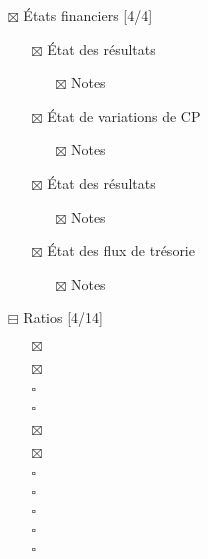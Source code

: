 \documentclass[11pt]{article}
\begin{document}
\begin{itemize}
\item[{$\boxtimes$}] États financiers [4/4]
\begin{itemize}
\item[{$\boxtimes$}] État des résultats
\begin{itemize}
\item[{$\boxtimes$}] Notes
\end{itemize}
\item[{$\boxtimes$}] État de variations de CP
\begin{itemize}
\item[{$\boxtimes$}] Notes
\end{itemize}
\item[{$\boxtimes$}] État des résultats
\begin{itemize}
\item[{$\boxtimes$}] Notes
\end{itemize}
\item[{$\boxtimes$}] État des flux de trésorie
\begin{itemize}
\item[{$\boxtimes$}] Notes
\end{itemize}
\end{itemize}

\item[{$\boxminus$}] Ratios [4/14]

\begin{itemize}
\item[{$\boxtimes$}] 

\item[{$\boxtimes$}] 

\item[{$\square$}] 

\item[{$\square$}] 

\item[{$\boxtimes$}] 

\item[{$\boxtimes$}] 

\item[{$\square$}] 

\item[{$\square$}] 

\item[{$\square$}] 

\item[{$\square$}] 

\item[{$\square$}] 


\end{itemize}
\end{itemize}
\end{document}
